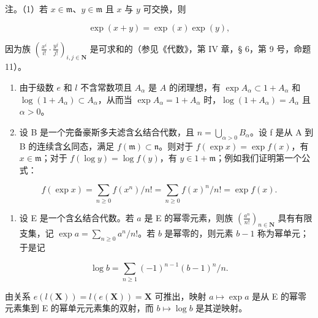 注。（1）若 \(x \in \mathfrak{m}\)、\(y \in \mathfrak{m}\) 且 \(x\) 与 \(y\) 可交换，则

\[
\exp (x + y) = \exp (x) \exp (y),
\]

因为族 \(\left(\frac{x^i}{i!}\cdot \frac{y^j}{j!}\right)_{i,j\in \mathbf{N}}\) 是可求和的（参见《代数》，第 IV 章，§ 6，第 9 号，命题 11）。

\begin{enumerate}
\def\labelenumi{(\arabic{enumi})}
\setcounter{enumi}{1}
\item
  由于级数 \(e\) 和 \(l\) 不含常数项且 \(A_{\alpha}\) 是 \(A\) 的闭理想，有 \(\exp A_{\alpha} \subset 1 + A_{\alpha}\) 和 \(\log (1 + A_{\alpha}) \subset A_{\alpha}\)，从而当 \(\exp A_{\alpha} = 1 + A_{\alpha}\) 时，\(\log (1 + A_{\alpha}) = A_{\alpha}\) 且 \(\alpha > 0\)。
\item
  设 B 是一个完备豪斯多夫滤含幺结合代数，且 \(n = \bigcup_{\alpha > 0} B_{\alpha}\)。设 f 是从 A 到 B 的连续含幺同态，满足 \(f(\mathfrak{m}) \subset \mathfrak{n}\)。则对于 \(f(\exp x) = \exp f(x)\)，有 \(x \in \mathfrak{m}\)；对于 \(f(\log y) = \log f(y)\)，有 \(y \in 1 + \mathfrak{m}\)；例如我们证明第一个公式：
\end{enumerate}

\[
f (\exp x) = \sum_ {n \geqslant 0} f (x ^ {n}) / n! = \sum_ {n \geqslant 0} f (x) ^ {n} / n! = \exp f (x).
\]

\begin{enumerate}
\def\labelenumi{(\arabic{enumi})}
\setcounter{enumi}{3}
\tightlist
\item
  设 E 是一个含幺结合代数。若 \(a\) 是 E 的幂零元素，则族 \(\left(\frac{a^n}{n!}\right)_{n\in \mathbf{N}}\) 具有有限支集，记 \(\exp a = \sum_{n\geqslant 0}a^n /n!\)。若 \(b\) 是幂零的，则元素 \(b - 1\) 称为幂单元；于是记
\end{enumerate}

\[
\log b = \sum_ {n \geqslant 1} (- 1) ^ {n - 1} (b - 1) ^ {n} / n.
\]

由关系 \(e(l(\mathbf{X})) = l(e(\mathbf{X})) = \mathbf{X}\) 可推出，映射 \(a \mapsto \exp a\) 是从 E 的幂零元素集到 E 的幂单元元素集的双射，而 \(b \mapsto \log b\) 是其逆映射。

